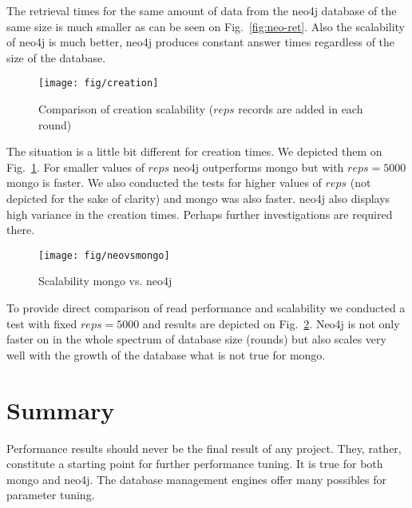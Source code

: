 \documentclass[a4paper,10pt]{article}
\begin{document}
The retrieval times for the same amount of data from the neo4j database of the same size is 
much smaller as can be seen on Fig.~\ref{fig:neo-ret}. Also the scalability of neo4j is 
much better, neo4j produces constant answer times regardless of the size of the database. 


\begin{figure}
\centering
 \texttt{[image: fig/creation]}
 \caption{Comparison of creation scalability ($reps$ records are added in each round)} \label{fig:creation}
\end{figure}

The situation is a little bit different for creation times. We depicted them on 
Fig.~\ref{fig:creation}. For smaller values of $reps$ neo4j outperforms mongo but 
with $reps = 5000$ mongo is faster. We also conducted the tests for higher values of 
$reps$ (not depicted for the sake of clarity) and mongo was also faster. neo4j 
also displays high variance in the creation times. Perhaps further investigations
are required there. 

\begin{figure}
\centering
 \texttt{[image: fig/neovsmongo]}
 \caption{Scalability mongo vs. neo4j} \label{fig:mongovsneo}
\end{figure}

To provide direct comparison of read performance and scalability we conducted 
a test with fixed $reps = 5000$ and results are depicted on Fig.~\ref{fig:mongovsneo}.
Neo4j is not only faster on in the whole spectrum of database size (rounds) but 
also scales very well with the growth of the database what is not true for mongo.


\section{Summary}
Performance results should never be the final result of any project. They, rather, constitute
a starting point for further performance tuning. It is true for both mongo and neo4j. The database
management engines offer many possibles for parameter tuning. 
\end{document}

